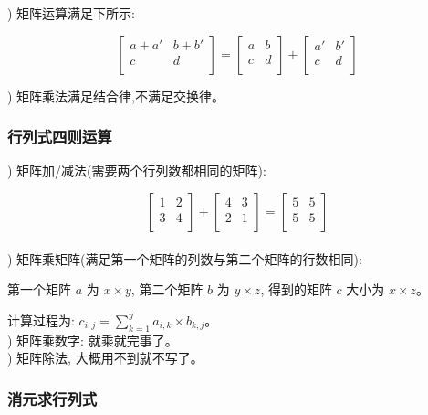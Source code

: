 \documentclass[a4paper,12pt]{article}
\begin{document}
) 矩阵运算满足下所示: 

$$\begin{bmatrix} a+a'&b+b'\\c&d\\ \end{bmatrix} = \begin{bmatrix} a&b\\c&d\\ \end{bmatrix} + \begin{bmatrix} a'&b'\\c&d\\ \end{bmatrix}$$

) 矩阵乘法满足结合律,不满足交换律。 

\subsubsection{行列式四则运算}

) 矩阵加/减法(需要两个行列数都相同的矩阵):

$$\begin{bmatrix} 1&2\\3&4\\ \end{bmatrix} + \begin{bmatrix} 4&3\\2&1\\ \end{bmatrix} = \begin{bmatrix} 5&5\\5&5\\ \end{bmatrix}$$
\\
) 矩阵乘矩阵(满足第一个矩阵的列数与第二个矩阵的行数相同): 

\noindent 第一个矩阵 $a$ 为 $x \times y$, 第二个矩阵 $b$ 为 $y \times z$, 得到的矩阵 $c$ 大小为 $x \times z$。

\noindent 计算过程为: $c_{i,j} = \sum_{k=1}^{y} a_{i,k} \times b_{k,j}$。\\


) 矩阵乘数字: 就乘就完事了。\\

) 矩阵除法, 大概用不到就不写了。

\subsubsection{消元求行列式}
\end{document}
